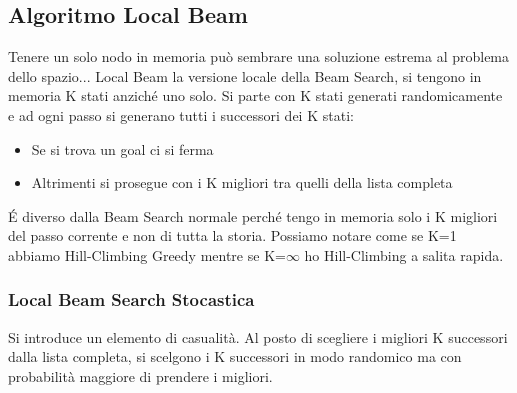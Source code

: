 \documentclass{article}
\begin{document}
\subsection{Algoritmo Local Beam}
Tenere un solo nodo in memoria può sembrare una soluzione estrema al problema dello spazio... Local Beam la versione locale della Beam Search, si tengono in memoria K stati anziché uno solo. Si parte con K stati generati randomicamente e ad ogni passo si generano tutti i successori dei K stati:
\begin{itemize}
    \item Se si trova un goal ci si ferma
    \item Altrimenti si prosegue con i K migliori tra quelli della lista completa
\end{itemize}
É diverso dalla Beam Search normale perché tengo in memoria solo i K migliori del passo corrente e non di tutta la storia. Possiamo notare come se K=1 abbiamo Hill-Climbing Greedy mentre se K=$\infty$ ho Hill-Climbing a salita rapida.

\subsubsection{Local Beam Search Stocastica}
Si introduce un elemento di casualità. Al posto di scegliere i migliori K successori dalla lista completa, si scelgono i K successori in modo randomico ma con probabilità maggiore di prendere i migliori.
\end{document}
